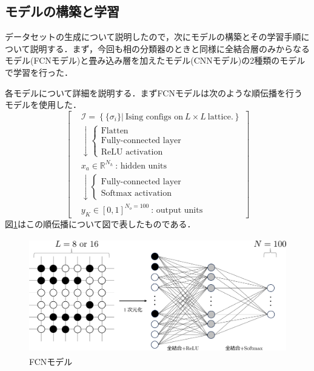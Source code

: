\documentclass[a4paper,11pt]{jsreport}
\begin{document}
\subsection{モデルの構築と学習}
データセットの生成について説明したので，次にモデルの構築とその学習手順について説明する．まず，今回も相の分類器のときと同様に全結合層のみからなるモデル(FCNモデル)と畳み込み層を加えたモデル(CNNモデル)の2種類のモデルで学習を行った．\par
各モデルについて詳細を説明する．まずFCNモデルは次のような順伝播を行うモデルを使用した．
\begin{equation}
  \left[
    \begin{aligned}
      & \mathcal{I} = \left\{ \{ \sigma_i \} \Big| \ \text{Ising configs on} \ L \times L \ \text{lattice.} \right\} \\
       & \downarrow
      \begin{cases}
        \text{Flatten} \\
        \text{Fully-connected layer} \\
        \text{ReLU activation}
      \end{cases} \\
       & x_a \in \mathbb{R}^{N_h} \ \text{: hidden units} \\
       & \downarrow
      \begin{cases}
        \text{Fully-connected layer} \\
        \text{Softmax activation}
      \end{cases} \\
       & y_K \in [0,1]^{N_o=100} \ \text{: output units}
    \end{aligned}
    \right]
\end{equation}
図\ref{温度測定器FCNモデル}はこの順伝播について図で表したものである．
\begin{figure}[H]
  \begin{center}
    \includegraphics[height=5cm]{image/温度測定器FCN.png}
    \caption{FCNモデル}
    \label{温度測定器FCNモデル}
  \end{center}
\end{figure}
\end{document}
